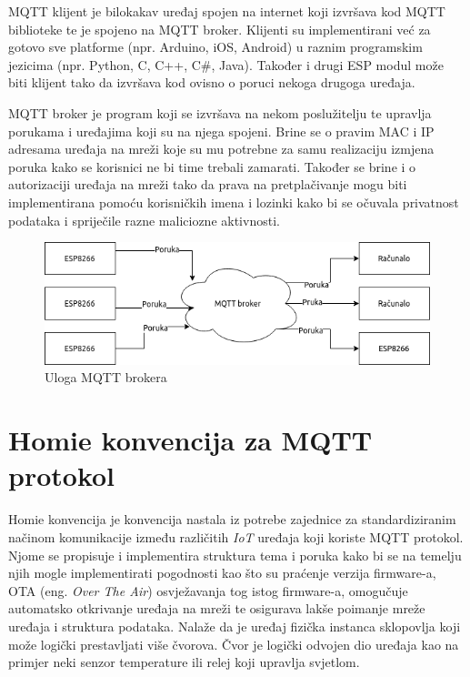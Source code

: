 \documentclass[times, utf8, zavrsni]{fer}
\begin{document}
MQTT klijent je bilokakav uređaj spojen na internet koji izvršava kod MQTT biblioteke te je spojeno na MQTT broker.
Klijenti su implementirani već za gotovo sve platforme (npr. Arduino, iOS, Android) u raznim programskim jezicima (npr. Python, C, C++, C\#, Java).
Također i drugi ESP modul može biti klijent tako da izvršava kod ovisno o poruci nekoga drugoga uređaja.

MQTT broker je program koji se izvršava na nekom poslužitelju te upravlja porukama i uređajima koji su na njega spojeni.
Brine se o pravim MAC i IP adresama uređaja na mreži koje su mu potrebne za samu realizaciju izmjena poruka kako se korisnici ne bi time trebali zamarati.
Također se brine i o autorizaciji uređaja na mreži tako da prava na pretplačivanje mogu biti implementirana pomoću korisničkih imena i lozinki kako bi se očuvala privatnost podataka i spriječile razne maliciozne aktivnosti.

\begin{figure}[h]
    \centering
    \includegraphics[scale=0.5]{Topologija.png}
    \caption{Uloga MQTT brokera}
\end{figure}

\section{Homie konvencija za MQTT protokol}
Homie konvencija je konvencija nastala iz potrebe zajednice za standardiziranim načinom komunikacije između različitih \textit{IoT} uređaja koji koriste MQTT protokol.
Njome se propisuje i implementira struktura tema i poruka kako bi se na temelju njih mogle implementirati pogodnosti kao što su praćenje verzija firmware-a, OTA (eng. \textit{Over The Air}) osvježavanja tog istog firmware-a, omogučuje automatsko otkrivanje uređaja na mreži te osigurava lakše poimanje mreže uređaja i struktura podataka.
Nalaže da je uređaj fizička instanca sklopovlja koji može logički prestavljati više čvorova.
Čvor je logički odvojen dio uređaja kao na primjer neki senzor temperature ili relej koji upravlja svjetlom.
\end{document}
